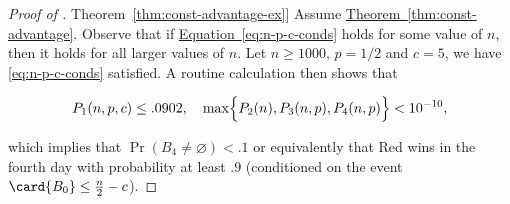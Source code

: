 \documentclass[11pt]{article}
\numberwithin{equation}{section}
\theoremstyle{definition}
\theoremstyle{plain}
\newcommand{\expref}[2]{\hyperref[#2]{#1~\ref{#2}}}
\newcommand{\expeqref}[2]{\hyperref[#2]{#1~\eqref{#2}}}
\begin{document}
			\begin{proof}[Proof of \expref{Theorem}{thm:const-advantage-ex}]
				Assume \expref{Theorem}{thm:const-advantage}. Observe that if  %
				\expeqref{Equation}{eq:n-p-c-conds} holds  %
				for some value of $n$, then  %
				it holds  %
				for all larger values of $n$.
				Let $n \ge 1000$, $p = 1/2$ and $c = 5$, we have  %
				\eqref{eq:n-p-c-conds}  %
				satisfied. A routine calculation then shows that
				\begin{linenomath}\begin{equation*}
						P_1(n, p, c)\le   %
						.0902  %
						, \quad \max\Bigl\{P_2(n), P_3(n, p), P_4(n, p)\Bigr\} < 10^{-10} , \end{equation*}\end{linenomath}
				\noindent which implies that $ \Pr \left(B_4\neq \varnothing \right) < .1$ or equivalently that Red wins in the fourth day with probability at least $.9$
				(conditioned on the event $\card{B_0} \le \frac{n}{2} - c$).
			\end{proof}
			
\end{document}
